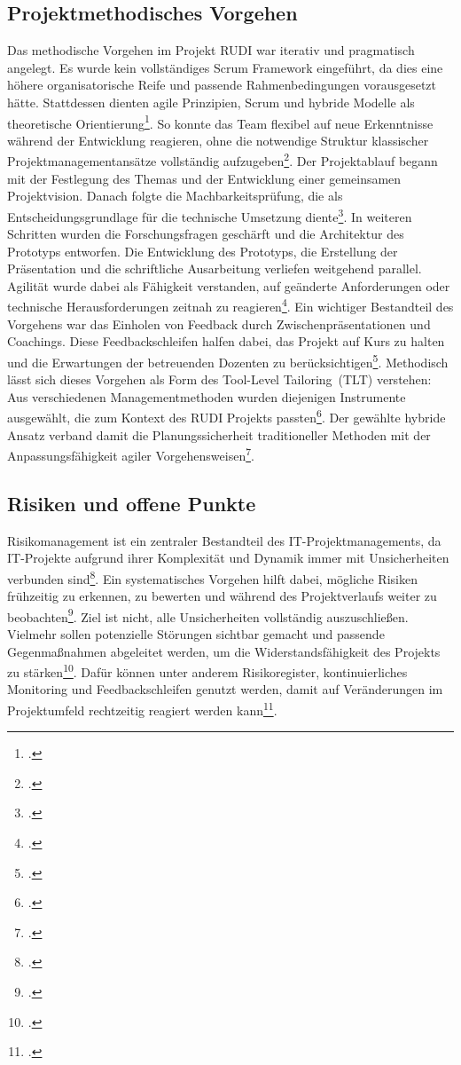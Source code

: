 \documentclass[12pt]{article}
\begin{document}
\subsection{Projektmethodisches Vorgehen}
Das methodische Vorgehen im Projekt RUDI war iterativ und pragmatisch angelegt. 
Es wurde kein vollständiges Scrum Framework eingeführt, da dies eine höhere 
organisatorische Reife und passende Rahmenbedingungen vorausgesetzt hätte. 
Stattdessen dienten agile Prinzipien, Scrum und hybride Modelle als theoretische 
Orientierung\footcite[Vgl.][1585]{syed-2023}. So konnte das Team flexibel auf neue 
Erkenntnisse während der Entwicklung reagieren, ohne die notwendige Struktur 
klassischer Projektmanagementansätze vollständig aufzugeben\footcite[Vgl.][1583]{syed-2023}. 
Der Projektablauf begann mit der Festlegung des Themas und der Entwicklung einer 
gemeinsamen Projektvision. Danach folgte die Machbarkeitsprüfung, die als 
Entscheidungsgrundlage für die technische Umsetzung diente\footcite[Vgl.][517--518]{sitnikov-2024}. 
In weiteren Schritten wurden die Forschungsfragen geschärft und die Architektur 
des Prototyps entworfen. Die Entwicklung des Prototyps, die Erstellung der 
Präsentation und die schriftliche Ausarbeitung verliefen weitgehend parallel. 
Agilität wurde dabei als Fähigkeit verstanden, auf geänderte Anforderungen oder 
technische Herausforderungen zeitnah zu reagieren\footcite[Vgl.][835--836]{rathor-2024}. 
Ein wichtiger Bestandteil des Vorgehens war das Einholen von Feedback durch 
Zwischenpräsentationen und Coachings. Diese Feedbackschleifen halfen dabei, das 
Projekt auf Kurs zu halten und die Erwartungen der betreuenden Dozenten zu 
berücksichtigen\footcite[Vgl.][64--65]{stan-2024}. Methodisch lässt sich dieses 
Vorgehen als Form des \glqq Tool-Level Tailoring\grqq\ (TLT) verstehen: Aus 
verschiedenen Managementmethoden wurden diejenigen Instrumente ausgewählt, die 
zum Kontext des RUDI Projekts passten\footcite[Vgl.][6--7]{gorog-2025}. Der 
gewählte hybride Ansatz verband damit die Planungssicherheit traditioneller 
Methoden mit der Anpassungsfähigkeit agiler Vorgehensweisen\footcite[Vgl.][124--125]{agbejule-2022}.
\subsection{Risiken und offene Punkte}
Risikomanagement ist ein zentraler Bestandteil des IT-Projektmanagements, da 
IT-Projekte aufgrund ihrer Komplexität und Dynamik immer mit Unsicherheiten 
verbunden sind\footcite[Vgl.][517--518]{sitnikov-2024}. Ein systematisches Vorgehen 
hilft dabei, mögliche Risiken frühzeitig zu erkennen, zu bewerten und während des 
Projektverlaufs weiter zu beobachten\footcite[Vgl.][64--65]{stan-2024}. 
Ziel ist nicht, alle Unsicherheiten vollständig auszuschließen. Vielmehr sollen 
potenzielle Störungen sichtbar gemacht und passende Gegenmaßnahmen abgeleitet werden, 
um die Widerstandsfähigkeit des Projekts zu stärken\footcite[Vgl.][64--65]{stan-2024}. 
Dafür können unter anderem Risikoregister, kontinuierliches Monitoring und 
Feedbackschleifen genutzt werden, damit auf Veränderungen im Projektumfeld rechtzeitig 
reagiert werden kann\footcite[Vgl.][65]{stan-2024}.
\end{document}
